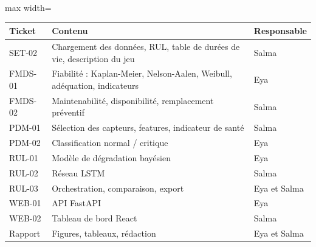 \begin{center}\small
\begin{adjustbox}{max width=\linewidth}
\begin{tabular}{lll}
\toprule
Ticket & Contenu & Responsable \\
\midrule
SET-02 & Chargement des données, RUL, table de durées de vie, description du jeu & Salma \\
FMDS-01 & Fiabilité : Kaplan-Meier, Nelson-Aalen, Weibull, adéquation, indicateurs & Eya \\
FMDS-02 & Maintenabilité, disponibilité, remplacement préventif & Salma \\
PDM-01 & Sélection des capteurs, features, indicateur de santé & Salma \\
PDM-02 & Classification normal / critique & Eya \\
RUL-01 & Modèle de dégradation bayésien & Eya \\
RUL-02 & Réseau LSTM & Salma \\
RUL-03 & Orchestration, comparaison, export & Eya et Salma \\
WEB-01 & API FastAPI & Eya \\
WEB-02 & Tableau de bord React & Salma \\
Rapport & Figures, tableaux, rédaction & Eya et Salma \\
\bottomrule
\end{tabular}
\end{adjustbox}
\end{center}
